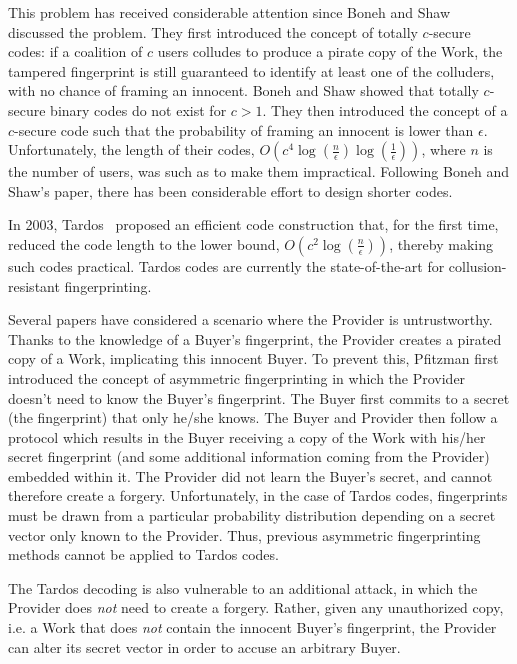 \documentclass{article}
\begin{document}
This problem has received considerable attention since Boneh and
Shaw~\cite{Boneh1998Collusion} discussed the problem.
They first introduced the concept of totally $c$-secure codes:
if a coalition of $c$ users colludes to produce a
pirate copy of the Work, the tampered fingerprint is still guaranteed to identify at
least one of the colluders, with no chance of framing an innocent.
Boneh and Shaw showed that totally
$c$-secure binary codes do not exist for $c>1$. They then introduced the
concept of a $c$-secure code such that the probability of framing an innocent is lower than $\epsilon$.
Unfortunately, the length of
their codes, $O(c^4
\log(\frac{n}{\epsilon})\log(\frac{1}{\epsilon}))$, where $n$ is the
number of users, was such as to make them impractical.
Following Boneh and Shaw's paper, there has been considerable
effort to design shorter codes.

In 2003, Tardos~\cite{Tardos2003Optimal} proposed an efficient code
construction that, for the first time, reduced the code length
  to the lower bound, $O(c^2 \log(\frac{n}{\epsilon}))$, thereby
making such codes practical.  Tardos codes are currently the
state-of-the-art for collusion-resistant fingerprinting.

Several papers have considered a scenario where the Provider is untrustworthy.
Thanks to the knowledge of a Buyer's fingerprint,
the Provider creates a pirated copy of a Work, implicating this innocent Buyer.
To prevent this, Pfitzman \cite{PfitzmannAsym} first introduced the concept of asymmetric
fingerprinting in which the Provider doesn't need to know the Buyer's fingerprint. 
The Buyer first
commits to a secret (the fingerprint) that only he/she knows.  The
Buyer and Provider then follow a protocol which results in the Buyer
receiving a copy of the Work with his/her secret fingerprint (and some
additional information coming from the Provider) embedded within it.
The Provider did not learn the Buyer's secret, and cannot
therefore create a forgery.  Unfortunately, in the case of Tardos
codes, fingerprints must be drawn from a particular
probability distribution depending on a secret vector only known to the Provider.
Thus, previous asymmetric fingerprinting methods cannot be applied 
to Tardos codes.

The Tardos decoding is also vulnerable to an additional attack, in
which the Provider does {\em not} need to create a forgery.  Rather,
given any unauthorized copy, i.e. a Work that does {\em not} contain the
innocent Buyer's fingerprint, the Provider can alter its secret
vector in order to accuse an arbitrary Buyer.
\end{document}
